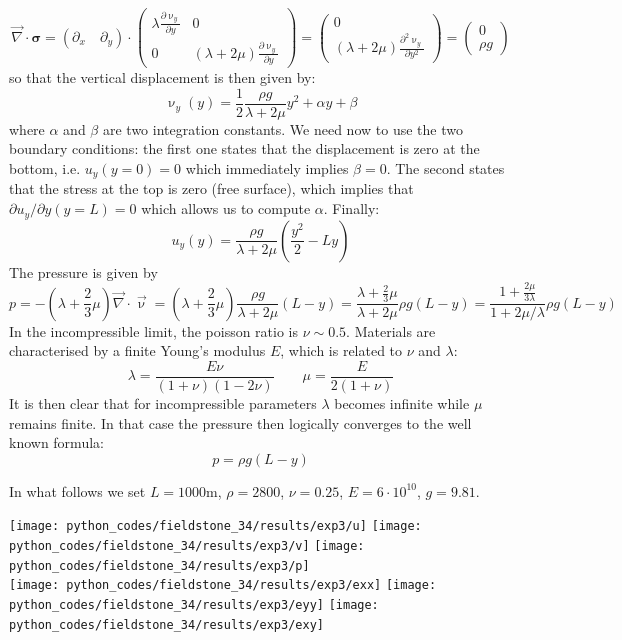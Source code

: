 \[
{\vec \nabla}\cdot {\bm \sigma} =
(\partial_x \quad \partial_y)\cdot 
\left(
\begin{array}{cc}
\lambda \frac{\partial \upnu_y}{\partial y} &  0 \\
0 & (\lambda + 2 \mu) \frac{\partial \upnu_y}{\partial y}
\end{array}
\right)
=
\left(
\begin{array}{c}
0 \\
(\lambda + 2 \mu) \frac{\partial^2 \upnu_y}{\partial y^2}
\end{array}
\right)
=
\left(
\begin{array}{c}
0 \\
\rho g
\end{array}
\right)
\]
so that the vertical displacement is then given by:
\[
\upnu_y(y) = \frac{1}{2} \frac{\rho g}{\lambda + 2 \mu} y^2 + \alpha y + \beta 
\] 
where $\alpha$ and $\beta$ are two integration constants.
We need now to use the two boundary conditions: the first one states that the displacement
is zero at the bottom, i.e. $u_y(y=0)=0$ which immediately implies $\beta=0$.
The second states that the stress at the top is zero (free surface), which implies that 
$\partial u_y/\partial y (y=L)=0$ which allows us to compute $\alpha$.
Finally:
\[
u_y(y) = \frac{\rho g}{\lambda + 2 \mu} (\frac{y^2}{2}-L y) 
\] 
The pressure is given by
\[
p=-(\lambda + \frac{2}{3} \mu) {\vec \nabla}\cdot{\vec\upnu}
= (\lambda + \frac{2}{3} \mu)  \frac{\rho g}{\lambda + 2 \mu} (L -y)
= \frac{\lambda + \frac{2}{3} \mu}{\lambda + 2 \mu} \rho g (L-y)  
= \frac{1 + \frac{2 \mu}{3 \lambda} }{1 + 2 \mu/\lambda} \rho g (L-y)  
\]
In the incompressible limit, the poisson ratio is $\nu \sim 0.5$. 
Materials are characterised by a finite Young's modulus $E$, which is related to 
$\nu$ and $\lambda$:
\[
\lambda=\frac{E \nu}{(1+\nu)(1-2\nu)}
\quad\quad
\mu=\frac{E}{2(1+\nu)}
\]
It is then clear that for incompressible parameters $\lambda$ becomes 
infinite while $\mu$ remains finite. In that case the pressure 
then logically converges to the well known formula:
\[
p=\rho g (L-y)
\]

In what follows we set $L=1000$m, $\rho=2800$, $\nu=0.25$, $E=6\cdot10^{10}$, $g=9.81$.

\begin{center}
\texttt{[image: python\_codes/fieldstone\_34/results/exp3/u]}
\texttt{[image: python\_codes/fieldstone\_34/results/exp3/v]}
\texttt{[image: python\_codes/fieldstone\_34/results/exp3/p]}\\
\texttt{[image: python\_codes/fieldstone\_34/results/exp3/exx]}
\texttt{[image: python\_codes/fieldstone\_34/results/exp3/eyy]}
\texttt{[image: python\_codes/fieldstone\_34/results/exp3/exy]}
\end{center}

